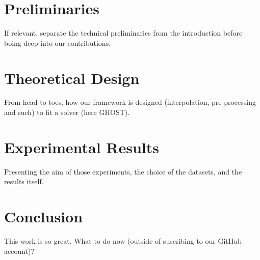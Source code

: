 \documentclass[letterpaper]{article} %
\begin{document}
\section{Preliminaries}\label{sec:preliminaries}
If relevant, separate the technical preliminaries from the introduction before boing deep into our contributions.

\section{Theoretical Design}\label{sec:theory}

From head to toes, how our framework is designed (interpolation, pre-processing and such) to fit a solver (here GHOST).

\section{Experimental Results}\label{sec:xp}
Presenting the aim of those experiments, the choice of the datasets, and the results itself.

\section{Conclusion}\label{sec:conclusion}
This work is so great. What to do now (outside of suscribing to our GitHub account)?

%


\end{document}

